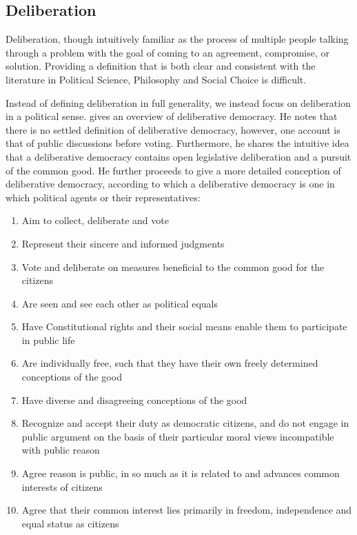 \subsection{Deliberation}

Deliberation, though intuitively familiar as
the process of multiple people talking through a problem with the goal of
coming to an agreement, compromise, or solution. Providing a definition that is
both clear and consistent with the literature in Political Science, Philosophy
and Social Choice is difficult.

Instead of defining deliberation in full generality, we instead focus on
deliberation in a political
sense. \citet{freemanDeliberativeDemocracySympathetic2000} gives an overview of
deliberative democracy. He notes that there is no settled definition of
deliberative democracy, however, one account is that of public discussions
before voting. Furthermore, he shares the intuitive idea that a deliberative
democracy contains open legislative deliberation and a pursuit of the common
good. He further proceeds to give a more detailed conception of deliberative
democracy, according to which a deliberative democracy is one in which
political agents or their representatives:

\begin{enumerate}
	\label{list:deliberative-democracy}
	\setlength\itemsep{1px}
	\item  Aim to collect, deliberate and vote
	\item  Represent their sincere and informed judgments
	\item  Vote and deliberate on measures beneficial to the common good for the citizens
	\item  Are seen and see each other as political equals
	\item  Have Constitutional rights and their social means enable them to participate in public life
	\item  Are individually free, such that they have their own freely determined conceptions of the good
	\item  Have diverse and disagreeing conceptions of the good
	\item  Recognize and accept their duty as democratic citizens, and do not engage in public argument on the basis of their particular moral views incompatible with public reason
	\item  Agree reason is public, in so much as it is related to and advances common interests of citizens
	\item  Agree that their common interest lies primarily in freedom, independence and equal status as citizens
\end{enumerate}

